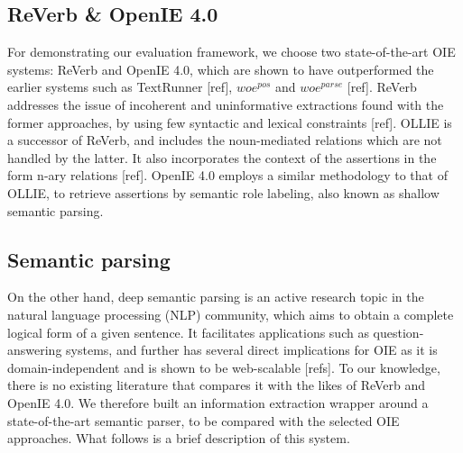 \documentclass{llncs}
\begin{document}
\subsection{ReVerb \& OpenIE 4.0}
For demonstrating our evaluation framework, we choose two state-of-the-art OIE systems: ReVerb and OpenIE 4.0, which are shown to have outperformed the earlier systems such as TextRunner [ref], $woe^{pos}$ and $woe^{parse}$ [ref]. ReVerb addresses the issue of incoherent and uninformative extractions found with the former approaches, by using few syntactic and lexical constraints [ref]. OLLIE is a successor of ReVerb, and includes the noun-mediated relations which are not handled by the latter. It also incorporates the context of the assertions in the form n-ary relations [ref]. OpenIE 4.0 employs a similar methodology to that of OLLIE, to retrieve assertions by semantic role labeling, also known as shallow semantic parsing.

\subsection{Semantic parsing}
On the other hand, deep semantic parsing is an active research topic in the natural language processing (NLP) community, which aims to obtain a complete logical form of a given sentence. It facilitates applications such as question-answering systems, and further has several direct implications for OIE as it is domain-independent and is shown to be web-scalable [refs]. To our knowledge, there is no existing literature that compares it with the likes of ReVerb and OpenIE 4.0. We therefore built an information extraction wrapper around a state-of-the-art semantic parser, to be compared with the selected OIE approaches. What follows is a brief description of this system.
\end{document}
